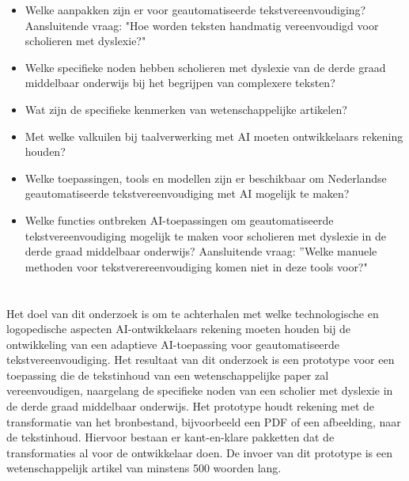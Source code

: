 \begin{itemize}
	\item Welke aanpakken zijn er voor geautomatiseerde tekstvereenvoudiging? Aansluitende vraag: "Hoe worden teksten handmatig vereenvoudigd voor scholieren met dyslexie?"
	\item Welke specifieke noden hebben scholieren met dyslexie van de derde graad middelbaar onderwijs bij het begrijpen van complexere teksten?
	\item Wat zijn de specifieke kenmerken van wetenschappelijke artikelen?
	\item Met welke valkuilen bij taalverwerking met AI moeten ontwikkelaars rekening houden?
	\item Welke toepassingen, tools en modellen zijn er beschikbaar om Nederlandse geautomatiseerde tekstvereenvoudiging met AI mogelijk te maken?
	\item Welke functies ontbreken AI-toepassingen om geautomatiseerde tekstvereenvoudiging mogelijk te maken voor scholieren met dyslexie in de derde graad middelbaar onderwijs? Aansluitende vraag: ”Welke manuele methoden voor tekstverereenvoudiging komen niet in deze tools voor?"
\end{itemize}


\section{}%
\label{sec:onderzoeksdoelstelling}


Het doel van dit onderzoek is om te achterhalen met welke technologische en logopedische aspecten AI-ontwikkelaars rekening moeten houden bij de ontwikkeling van een adaptieve AI-toepassing voor geautomatiseerde tekstvereenvoudiging. Het resultaat van dit onderzoek is een prototype voor een toepassing die de tekstinhoud van een wetenschappelijke paper zal vereenvoudigen, naargelang de specifieke noden van een scholier met dyslexie in de derde graad middelbaar onderwijs. Het prototype houdt rekening met de transformatie van het bronbestand, bijvoorbeeld een PDF of een afbeelding, naar de tekstinhoud. Hiervoor bestaan er kant-en-klare pakketten dat de transformaties al voor de ontwikkelaar doen. De invoer van dit prototype is een wetenschappelijk artikel van minstens 500 woorden lang.

